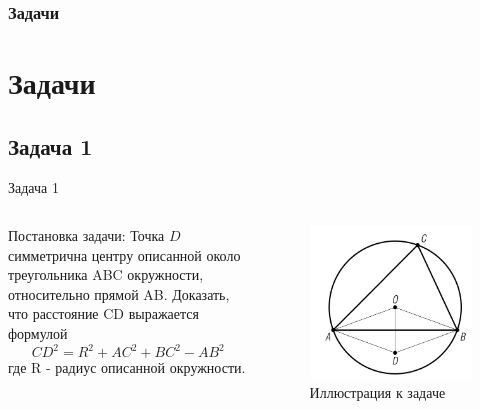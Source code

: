 \documentclass{beamer}
\newcommand\frametitleSpec[1]{%
\frametitle{#1}
\section{#1}%
}
\begin{document}
\begin{frame}
   \frametitleSpec{Задачи}
   \subsection{Задача 1}
   \begin{block}{Задача 1}
      \begin{columns}
         \begin{column}{0.5\textwidth}
            Постановка задачи:
            Точка \(D\) симметрична центру описанной около треугольника ABC окружности, относительно прямой AB.
            Доказать, что расстояние CD выражается формулой
            \begin{equation}
               CD^2 = R^2 +AC^2 + BC^2 - AB^2
               \label{t1:f1}
            \end{equation}
            где R - радиус описанной окружности.
         \end{column}
         \begin{column}{0.5\textwidth}
            \begin{figure}[h]
               \centering
               \includegraphics[width=1\textwidth]{images/task1.png}
               \caption{Иллюстрация к задаче}
               \label{t1:im}
            \end{figure}
         \end{column}
      \end{columns}
   \end{block}
\end{frame}
\end{document}
